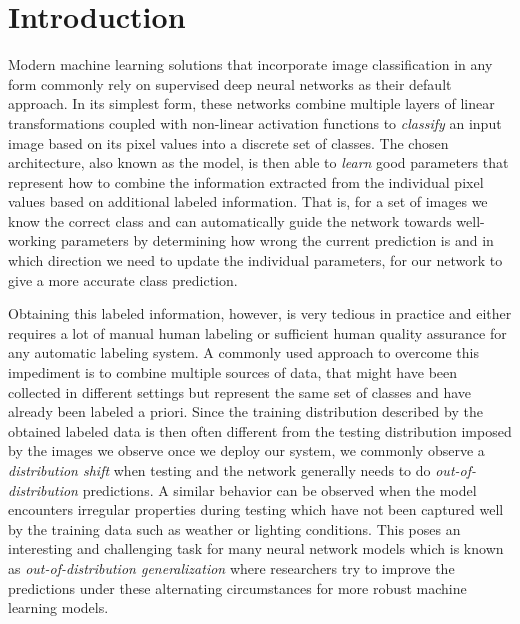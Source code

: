 \chapter{Introduction} 
\label{sec:Introduction}

Modern machine learning solutions that incorporate image classification in any form commonly rely on supervised deep neural networks as their default approach. In its simplest form, these networks combine multiple layers of linear transformations coupled with non-linear activation functions to \emph{classify} an input image based on its pixel values into a discrete set of classes. The chosen architecture, also known as the model, is then able to \emph{learn} good parameters  that represent how to combine the information extracted from the individual pixel values based on additional labeled information. That is, for a set of images we know the correct class and can automatically guide the network towards well-working parameters by determining how wrong the current prediction is and in which direction we need to update the individual parameters, for our network to give a more accurate class prediction. 

Obtaining this labeled information, however, is very tedious in practice and either requires a lot of manual human labeling or sufficient human quality assurance for any automatic labeling system. A commonly used approach to overcome this impediment is to combine multiple sources of data, that might have been collected in different settings but represent the same set of classes and have already been labeled a priori. Since the training distribution described by the obtained labeled data is then often different from the testing distribution imposed by the images we observe once we deploy our system, we commonly observe a \emph{distribution shift} when testing and the network generally needs to do \emph{out-of-distribution} predictions. A similar behavior can be observed when the model encounters irregular properties during testing which have not been captured well by the training data such as weather or lighting conditions. This poses an interesting and challenging task for many neural network models which is known as \emph{out-of-distribution generalization} where researchers try to improve the predictions under these alternating circumstances for more robust machine learning models.


